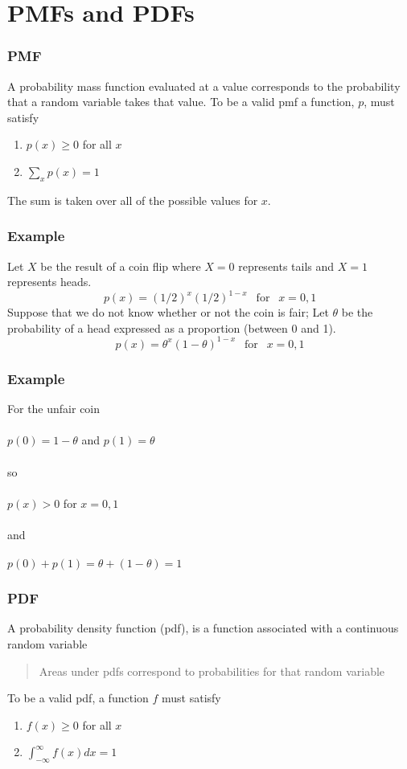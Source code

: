 \documentclass[aspectratio=169]{beamer}
\begin{document}
\section{PMFs and PDFs}
\begin{frame}
\frametitle{PMF}
A probability mass function evaluated at a value corresponds to the
probability that a random variable takes that value. To be a valid
pmf a function, $p$, must satisfy
  \begin{enumerate}
  \item $p(x) \geq 0$ for all $x$
  \item $\sum_{x} p(x) = 1$
  \end{enumerate}
The sum is taken over all of the possible values for $x$.
\end{frame}


\begin{frame}
 \frametitle{Example}
Let $X$ be the result of a coin flip where $X=0$ represents
tails and $X = 1$ represents heads.
$$
p(x) = (1/2)^{x} (1/2)^{1-x} ~~\mbox{ for }~~x = 0,1
$$
Suppose that we do not know whether or not the coin is fair; Let
$\theta$ be the probability of a head expressed as a proportion
(between 0 and 1).
$$
p(x) = \theta^{x} (1 - \theta)^{1-x} ~~\mbox{ for }~~x = 0,1
$$
\end{frame}

\begin{frame}
 \frametitle{Example}
For the unfair coin \\ \ \\
$p(0) = 1 - \theta$ and $p(1) = \theta$ \\ \ \\
so \\ \ \\
$p(x) > 0$ for $x=0,1$ \\ \ \\
and \\ \ \\
$p(0) + p(1) = \theta + (1 - \theta) = 1$
\end{frame}

\begin{frame}
\frametitle{PDF}
  A probability density function (pdf), is a function associated with
  a continuous random variable 
  \begin{quote}
    Areas under pdfs correspond to
probabilities for that random variable
  \end{quote}
 To be a valid pdf, a
 function $f$ must satisfy
\begin{enumerate}
\item $f(x) \geq 0$ for all $x$
\item $\int_{-\infty}^{\infty} f(x)dx = 1$
\end{enumerate}
\end{frame}
\end{document}
